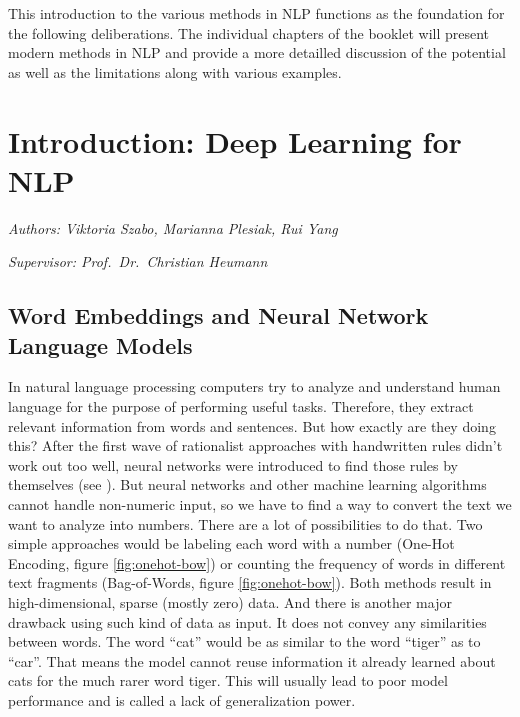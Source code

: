 \documentclass[]{krantz}
\begin{document}
This introduction to the various methods in NLP functions as the foundation for the following deliberations. The individual chapters of the booklet will present modern methods in NLP and provide a more detailled discussion of the potential as well as the limitations along with various examples.

\hypertarget{introduction-deep-learning-for-nlp}{%
\chapter{Introduction: Deep Learning for NLP}\label{introduction-deep-learning-for-nlp}}

\emph{Authors: Viktoria Szabo, Marianna Plesiak, Rui Yang}

\emph{Supervisor: Prof.~Dr.~Christian Heumann}

\hypertarget{word-embeddings-and-neural-network-language-models}{%
\section{Word Embeddings and Neural Network Language Models}\label{word-embeddings-and-neural-network-language-models}}

In natural language processing computers try to analyze and understand human language for the purpose of performing useful tasks. Therefore, they extract relevant information from words and sentences. But how exactly are they doing this? After the first wave of rationalist approaches with handwritten rules didn't work out too well, neural networks were introduced to find those rules by themselves (see \citet{Bengio.2003}). But neural networks and other machine learning algorithms cannot handle non-numeric input, so we have to find a way to convert the text we want to analyze into numbers.
There are a lot of possibilities to do that. Two simple approaches would be labeling each word with a number (One-Hot Encoding, figure \ref{fig:onehot-bow}) or counting the frequency of words in different text fragments (Bag-of-Words, figure \ref{fig:onehot-bow}). Both methods result in high-dimensional, sparse (mostly zero) data. And there is another major drawback using such kind of data as input. It does not convey any similarities between words. The word ``cat'' would be as similar to the word ``tiger'' as to ``car''. That means the model cannot reuse information it already learned about cats for the much rarer word tiger. This will usually lead to poor model performance and is called a lack of generalization power.
\end{document}
